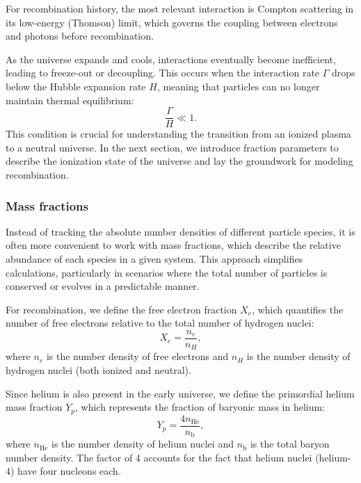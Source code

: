 \documentclass{aa}
\begin{document}
For recombination history, the most relevant interaction is Compton scattering in its low-energy (Thomson) limit, which governs the coupling between electrons and photons before recombination.

As the universe expands and cools, interactions eventually become inefficient, leading to freeze-out or decoupling. This occurs when the interaction rate $\Gamma$ drops below the Hubble expansion rate $H$, meaning that particles can no longer maintain thermal equilibrium:
\begin{equation}
\frac{\Gamma}{H} \ll 1.
\end{equation}
This condition is crucial for understanding the transition from an ionized plasma to a neutral universe. In the next section, we introduce fraction parameters to describe the ionization state of the universe and lay the groundwork for modeling recombination.
\color{black}






\subsubsection{Mass fractions}
\color{Plum}
Instead of tracking the absolute number densities of different particle species, it is often more convenient to work with mass fractions, which describe the relative abundance of each species in a given system. This approach simplifies calculations, particularly in scenarios where the total number of particles is conserved or evolves in a predictable manner.

For recombination, we define the free electron fraction $X_e$, which quantifies the number of free electrons relative to the total number of hydrogen nuclei:
\begin{equation}
X_e = \frac{n_e}{n_H},
\end{equation}
where $n_e$ is the number density of free electrons and $n_H$ is the number density of hydrogen nuclei (both ionized and neutral).

Since helium is also present in the early universe, we define the primordial helium mass fraction $Y_p$, which represents the fraction of baryonic mass in helium:
\begin{equation}
Y_p = \frac{4 n_{\text{He}}}{n_{\text{b}}},
\end{equation}
where $n_{\text{He}}$ is the number density of helium nuclei and $n_{\text{b}}$ is the total baryon number density. The factor of 4 accounts for the fact that helium nuclei (helium-4) have four nucleons each.
\end{document}
